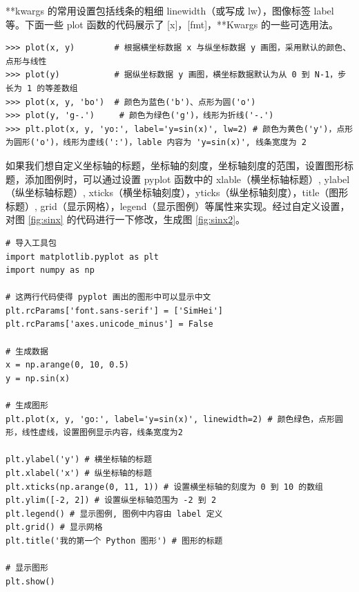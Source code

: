 **kwargs 的常用设置包括线条的粗细 linewidth（或写成 lw），图像标签  label 等。下面一些 plot 函数的代码展示了 [x]，[fmt]，**Kwargs 的一些可选用法。

\clearpage

\begin{lstlisting}[Language= Python]
>>> plot(x, y)        # 根据横坐标数据 x 与纵坐标数据 y 画图，采用默认的颜色、点形与线性
>>> plot(y)           # 据纵坐标数据 y 画图，横坐标数据默认为从 0 到 N-1，步长为 1 的等差数组
>>> plot(x, y, 'bo')  # 颜色为蓝色('b')、点形为圆('o')
>>> plot(y, 'g-.')     # 颜色为绿色('g')，线形为折线('-.')
>>> plt.plot(x, y, 'yo:', label='y=sin(x)', lw=2) # 颜色为黄色('y')，点形为圆形('o')，线形为虚线(':')，lable 内容为 'y=sin(x)', 线条宽度为 2
\end{lstlisting}


如果我们想自定义坐标轴的标题，坐标轴的刻度，坐标轴刻度的范围，设置图形标题，添加图例时，可以通过设置 pyplot 函数中的 xlable（横坐标轴标题）, ylabel（纵坐标轴标题）, xticks（横坐标轴刻度），yticks（纵坐标轴刻度），title（图形标题）, grid（显示网格），legend（显示图例）等属性来实现。经过自定义设置，对图 \ref{fig:sinx} 的代码进行一下修改，生成图 \ref{fig:sinx2}。


\begin{lstlisting}[Language = Python]
# 导入工具包
import matplotlib.pyplot as plt
import numpy as np

# 这两行代码使得 pyplot 画出的图形中可以显示中文
plt.rcParams['font.sans-serif'] = ['SimHei']
plt.rcParams['axes.unicode_minus'] = False

# 生成数据
x = np.arange(0, 10, 0.5)
y = np.sin(x)

# 生成图形
plt.plot(x, y, 'go:', label='y=sin(x)', linewidth=2) # 颜色绿色，点形圆形，线性虚线，设置图例显示内容，线条宽度为2

plt.ylabel('y') # 横坐标轴的标题
plt.xlabel('x') # 纵坐标轴的标题
plt.xticks(np.arange(0, 11, 1)) # 设置横坐标轴的刻度为 0 到 10 的数组
plt.ylim([-2, 2]) # 设置纵坐标轴范围为 -2 到 2
plt.legend() # 显示图例, 图例中内容由 label 定义
plt.grid() # 显示网格
plt.title('我的第一个 Python 图形') # 图形的标题

# 显示图形
plt.show()

\end{lstlisting}

